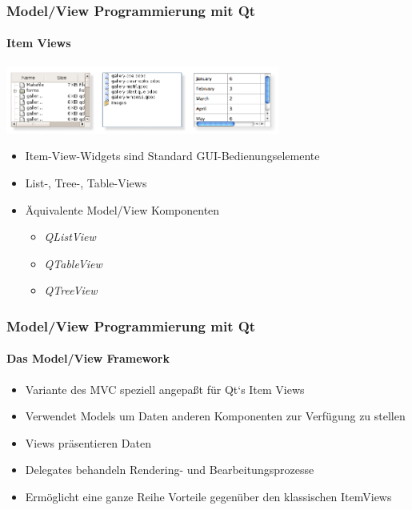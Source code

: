 \begin{frame}
	\frametitle{Model/View Programmierung mit Qt}
	\framesubtitle{Item Views}
	\begin{center}
		\includegraphics[width=9cm]{../mvc/qt-widgets.png}
	\end{center}
	\begin{itemize}
		\item Item-View-Widgets sind Standard GUI-Bedienungselemente
		\item List-, Tree-, Table-Views
		\item \"Aquivalente Model/View Komponenten
		\begin{itemize}
			\item {\itshape QListView}
			\item {\itshape QTableView}
			\item {\itshape QTreeView}
		\end{itemize}
	\end{itemize}
\end{frame}

\begin{frame}
	\frametitle{Model/View Programmierung mit Qt}
	\framesubtitle{Das Model/View Framework}
	\begin{itemize}
		\item Variante des MVC speziell angepaßt für Qt`s Item Views
		\item Verwendet Models um Daten anderen Komponenten zur Verfügung zu stellen
		\item Views präsentieren Daten
		\item Delegates behandeln Rendering- und Bearbeitungsprozesse
		\item Ermöglicht eine ganze Reihe Vorteile gegenüber den klassischen ItemViews
	\end{itemize}
\end{frame}

